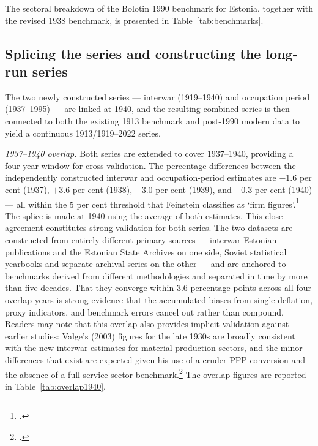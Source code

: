 \documentclass[12pt,a4paper]{article}
\begin{document}
The sectoral breakdown of the Bolotin 1990 benchmark for Estonia, together with the revised 1938 benchmark, is presented in Table~\ref{tab:benchmarks}.

\subsection{Splicing the series and constructing the long-run series}
\label{subsec:splicing}

The two newly constructed series — interwar (1919--1940) and occupation period (1937--1995) — are linked at 1940, and the resulting combined series is then connected to both the existing 1913 benchmark and post-1990 modern data to yield a continuous 1913/1919--2022 series.

\textit{1937--1940 overlap.} Both series are extended to cover 1937--1940, providing a four-year window for cross-validation. The percentage differences between the independently constructed interwar and occupation-period estimates are $-$1.6 per cent (1937), $+$3.6 per cent (1938), $-$3.0 per cent (1939), and $-$0.3 per cent (1940) — all within the 5 per cent threshold that Feinstein classifies as `firm figures'.\footnote{\autocite[21]{feinstein1972}.} The splice is made at 1940 using the average of both estimates. This close agreement constitutes strong validation for both series. The two datasets are constructed from entirely different primary sources — interwar Estonian publications and the Estonian State Archives on one side, Soviet statistical yearbooks and separate archival series on the other — and are anchored to benchmarks derived from different methodologies and separated in time by more than five decades. That they converge within 3.6 percentage points across all four overlap years is strong evidence that the accumulated biases from single deflation, proxy indicators, and benchmark errors cancel out rather than compound. Readers may note that this overlap also provides implicit validation against earlier studies: Valge's (2003) figures for the late 1930s are broadly consistent with the new interwar estimates for material-production sectors, and the minor differences that exist are expected given his use of a cruder PPP conversion and the absence of a full service-sector benchmark.\footnote{\autocite{valge2003all}.} The overlap figures are reported in Table~\ref{tab:overlap1940}.
\end{document}
